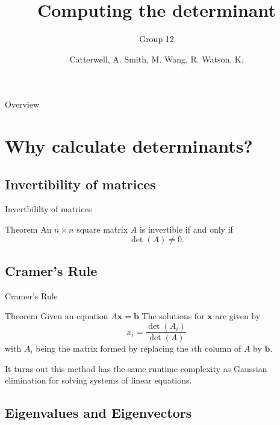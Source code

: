 \documentclass{beamer}
\title{Computing the determinant}
\subtitle{Group 12}
\author{Catterwell, A. \quad Smith, M. \quad Wang, R. \quad Watson, K.}
\institute{University of Edinburgh}
\begin{document}
\begin{frame}
    \maketitle
\end{frame}

\begin{frame}{Overview}
    \tableofcontents
\end{frame}

\section{Why calculate determinants?}

\subsection{Invertibility of matrices}
\begin{frame}{Invertbililty of matrices}

    \begin{block}{Theorem}
        An $n \times n$ square matrix $A$ is invertible if and only if
        \[
            \det(A) \neq 0.
        \]
    \end{block}

\end{frame}

\subsection{Cramer's Rule}

\begin{frame}{Cramer's Rule}

    \begin{block}{Theorem}
        Given an equation $A\mathbf{x} = \mathbf{b}$
        The solutions for $\mathbf{x}$ are given by
        \[
            x_i = \frac{\det(A_i)}{\det(A)}
        \]
        with $A_i$ being the matrix formed by replacing the $i$th column
        of $A$ by $\mathbf{b}$.
    \end{block}


    It turns out this method has the same runtime complexity as Gaussian elimination for solving
    systems of linear equations.

\end{frame}

\subsection{Eigenvalues and Eigenvectors}
\end{document}
